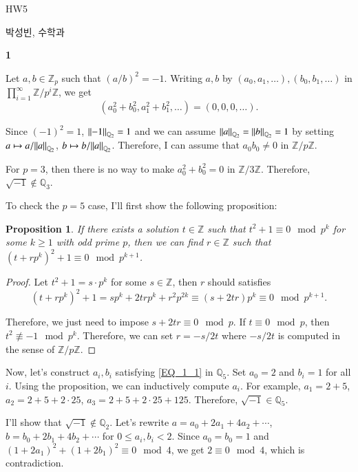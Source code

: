 \documentclass[a4paper, 12pt]{article}
\theoremstyle{Mydefinition}
\theoremstyle{Mytheorem}
\newtheorem{proposition}[statement]{Proposition}
\newcommand{\quotZ}[1]{\ensuremath{\mathbb{Z}/p^{#1}\mathbb{Z}}}
\begin{document}
\thispagestyle{myfirstpage}
\begin{center}
	\Large{HW5}
\end{center}
박성빈, 수학과

\noindent \textbf{1}

Let $a,b\in \mathbb{Z}_p$ such that $(a/b)^2 = -1$. Writing $a,b$ by $(a_0, a_1, \ldots), (b_0,b_1,\ldots)$ in $\prod_{i=1}^\infty \quotZ{i}$, we get
\begin{equation}\label{EQ_1_1}
    (a_0^2+b_0^2, a_1^2 + b_1^2, \ldots) = (0,0,0,\ldots).
\end{equation}

Since $(-1)^2 = 1$, $\norm{-1}_{\mathbb{Q}_2} = 1$ and we can assume $\norm{a}_{\mathbb{Q}_2} = \norm{b}_{\mathbb{Q}_2} = 1$ by setting $a \mapsto a/\norm{a}_{\mathbb{Q}_2}$, $b\mapsto b/\norm{a}_{\mathbb{Q}_2}$. Therefore, I can assume that $a_0b_0\neq 0$ in $\mathbb{Z}/p\mathbb{Z}$.

For $p=3$, then there is no way to make $a_0^2+b_0^2 = 0$ in $\mathbb{Z}/3\mathbb{Z}$. Therefore, $\sqrt{-1}\not\in\mathbb{Q}_3$.

To check the $p=5$ case, I'll first show the following proposition:
\begin{proposition}
If there exists a solution $t\in\mathbb{Z}$ such that $t^2+1\equiv 0\mod p^k$ for some $k\geq 1$ with odd prime $p$, then we can find $r\in\mathbb{Z}$ such that $(t+rp^k)^2+1\equiv 0\mod p^{k+1}$.
\end{proposition}
\begin{proof}
Let $t^2+1 = s\cdot p^k$ for some $s\in \mathbb{Z}$, then $r$ should satisfies
\begin{equation}
    (t+rp^k)^2+1 = sp^k + 2trp^k + r^2p^{2k}\equiv (s+2tr)p^k \equiv 0 \mod p^{k+1}.
\end{equation}

Therefore, we just need to impose $s+2tr \equiv 0 \mod p$. If $t\equiv 0\mod p$, then $t^2\not\equiv -1\mod p^k$. Therefore, we can set $r = -s/2t$ where $-s/2t$ is computed in the sense of $\mathbb{Z}/p\mathbb{Z}$.
\end{proof}

Now, let's construct $a_i, b_i$ satisfying \eqref{EQ_1_1} in $\mathbb{Q}_5$. Set $a_0=2$ and $b_i=1$ for all $i$. Using the proposition, we can inductively compute $a_i$. For example, $a_1 = 2+5$, $a_2 = 2+5+2\cdot 25$, $a_3 = 2+5+2\cdot 25 + 125$. Therefore, $\sqrt{-1}\in \mathbb{Q}_5$.

I'll show that $\sqrt{-1}\not\in \mathbb{Q}_2$. Let's rewrite $a = a_0+2a_1+4a_2+\cdots$, $b = b_0+2b_1+4b_2+\cdots$ for $0\leq a_i,b_i<2$. Since $a_0=b_0=1$ and $(1+2a_1)^2+(1+2b_1)^2 \equiv 0 \mod 4$, we get $2\equiv 0\mod 4$, which is contradiction.\\
\end{document}
